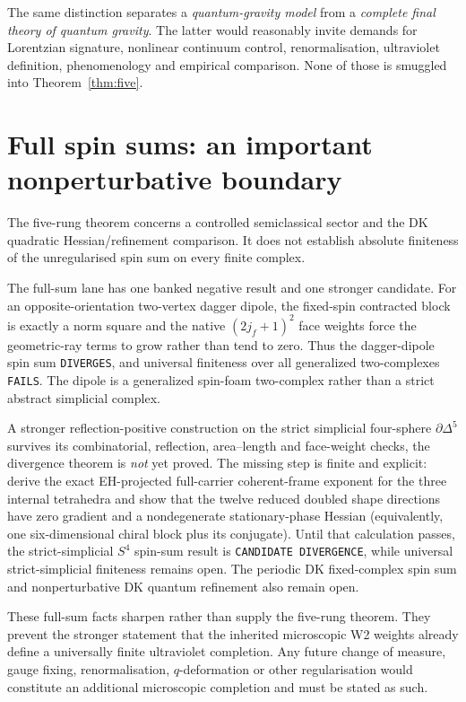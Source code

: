 \documentclass[11pt]{article}
\numberwithin{equation}{section}
\begin{document}
The same distinction separates a \emph{quantum-gravity model} from a \emph{complete final theory of quantum gravity}. The latter would reasonably invite demands for Lorentzian signature, nonlinear continuum control, renormalisation, ultraviolet definition, phenomenology and empirical comparison. None of those is smuggled into Theorem~\ref{thm:five}.

\section{Full spin sums: an important nonperturbative boundary}\label{sec:fullsums}

The five-rung theorem concerns a controlled semiclassical sector and the DK quadratic Hessian/refinement comparison. It does not establish absolute finiteness of the unregularised spin sum on every finite complex.

The full-sum lane has one banked negative result and one stronger candidate. For an opposite-orientation two-vertex dagger dipole, the fixed-spin contracted block is exactly a norm square and the native $(2j_f+1)^2$ face weights force the geometric-ray terms to grow rather than tend to zero. Thus the dagger-dipole spin sum \texttt{DIVERGES}, and universal finiteness over all generalized two-complexes \texttt{FAILS}. The dipole is a generalized spin-foam two-complex rather than a strict abstract simplicial complex.

A stronger reflection-positive construction on the strict simplicial four-sphere $\partial\Delta^5$ survives its combinatorial, reflection, area--length and face-weight checks, the divergence theorem is \emph{not} yet proved. The missing step is finite and explicit: derive the exact EH-projected full-carrier coherent-frame exponent for the three internal tetrahedra and show that the twelve reduced doubled shape directions have zero gradient and a nondegenerate stationary-phase Hessian (equivalently, one six-dimensional chiral block plus its conjugate). Until that calculation passes, the strict-simplicial $S^4$ spin-sum result is \texttt{CANDIDATE DIVERGENCE}, while universal strict-simplicial finiteness remains open. The periodic DK fixed-complex spin sum and nonperturbative DK quantum refinement also remain open.

These full-sum facts sharpen rather than supply the five-rung theorem. They prevent the stronger statement that the inherited microscopic W2 weights already define a universally finite ultraviolet completion. Any future change of measure, gauge fixing, renormalisation, $q$-deformation or other regularisation would constitute an additional microscopic completion and must be stated as such.
\end{document}
